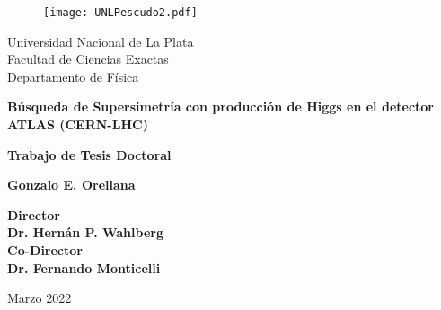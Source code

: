 


\thispagestyle{empty}
\begin{center}

\begin{figure}[h]
\centering
\texttt{[image: UNLPescudo2.pdf]}
\end{figure}

{\normalsize Universidad Nacional de La Plata\\}
{\normalsize Facultad de Ciencias Exactas\\}
{\normalsize Departamento de Física\\}


\vspace{2cm}

\hrulefill

{\bf \LARGE  Búsqueda de Supersimetría con producción de Higgs en el detector ATLAS (CERN-LHC)\\}

\vspace{0.6cm}

\hrulefill

\vspace{0.3cm}

{\normalsize \bf Trabajo de Tesis Doctoral \\}

\vspace{2.5cm}

{\Large \bf Gonzalo E. Orellana \\}

\vspace{3.5cm}

{\large\bf Director \\}
{\large\bf Dr. Hernán P. Wahlberg \\}
{\large\bf Co-Director \\}
{\large\bf Dr. Fernando Monticelli \\}

\vspace{2cm}

{\normalsize Marzo 2022}

\end{center}



\restoregeometry



